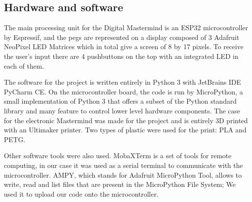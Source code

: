 \documentclass[a4paper, 12pt]{article}
\begin{document}
\subsection{Hardware and software}
The main processing unit for the Digital Mastermind is an ESP32
microcontroller by Espressif, and the pegs are represented on a display
composed of 3 Adafruit NeoPixel LED Matrices which in total give a
screen of 8 by 17 pixels. To receive the user’s input there are 4
pushbuttons on the top with an integrated LED in each of them.
\begin{figure}[H]%
    \centering
    \quad%
\end{figure}
The software for the project is written entirely in Python 3 with JetBrains
IDE PyCharm CE. On the microcontroller board, the code is run by MicroPython,
a small implementation of Python 3 that offers a subset of the Python standard
library and many feature to control lower level hardware components. The case
for the electronic Mastermind was made for the project and is entirely 3D
printed with an Ultimaker printer. Two types of plastic were used for the
print: PLA and PETG.  \par Other software tools were also used.  MobaXTerm is a set
of tools for remote computing, in our case it was used as a serial terminal to
communicate with the microcontroller. AMPY, which stands for Adafruit
MicroPython Tool, allows to write, read and list files that are present in the
MicroPython File System; We used it to upload our code onto the
microcontroller.
\end{document}
